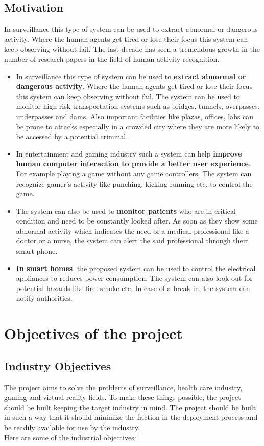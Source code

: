 \documentclass[11pt]{article}
\begin{document}
\subsection{\textbf{Motivation}}
In surveillance this type of system can be used to extract abnormal or dangerous activity. Where the human agents get tired or lose their focus this system can keep observing without fail. The last decade has seen a tremendous growth in the number of research papers in the field of human activity recognition. 
\begin{itemize}
	\item In surveillance this type of system can be used to \textbf{extract abnormal or dangerous activity}. Where the human agents get tired or lose their focus this system can keep observing without fail. The system can be used to monitor high risk transportation systems such as bridges, tunnels, overpasses, underpasses and dams. Also important facilities like plazas, offices, labs can be prone to attacks especially in a crowded city where they are more likely to be accessed by a potential criminal.
	\item In entertainment and gaming industry such a system can help \textbf{improve human computer interaction to provide a better user experience}. For example playing a game without any game controllers. The system can recognize gamer’s activity like punching, kicking running etc. to control the game.
	\item The system can also be used to \textbf{monitor patients} who are in critical condition and need to be constantly looked after. As soon as they show some abnormal activity which indicates the need of a medical professional like a doctor or a nurse, the system can alert the said professional through their smart phone. 
	\item\textbf{In smart homes}, the proposed system can be used to control the electrical appliances to reduces power consumption. The system can also look out for potential hazards like fire, smoke etc. In case of a break in, the system can notify authorities.   
\end{itemize}

\section{\textbf{Objectives of the project}}
\subsection{\textbf{Industry Objectives}}
The project aims to solve the problems of surveillance, health care industry, gaming and virtual reality fields. To make these things possible, the project should be built keeping the target industry in mind. The project should be built in such a way that it should minimize the friction in the deployment process and be readily available for use by the industry. \\
Here are some of the industrial objectives:
\end{document}
